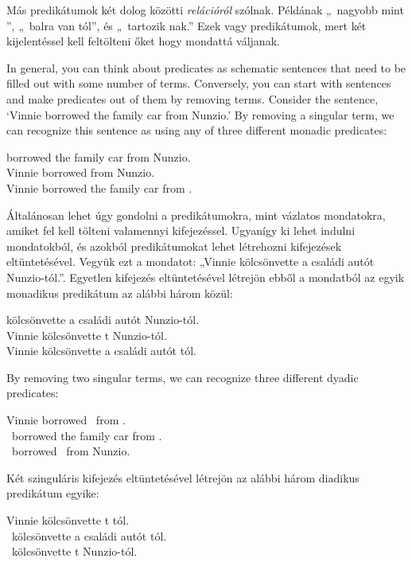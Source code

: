 Más predikátumok két dolog közötti \emph{relációról} szólnak. Példának „\blank\ nagyobb mint \blank”, „\blank\ balra van \blank\-tól”, és „\blank\ tartozik \blank\-nak.” Ezek  vagy  predikátumok, mert két kijelentéssel kell feltölteni őket hogy mondattá váljanak.

In general, you can think about predicates as schematic sentences that need to be filled out with some number of terms. Conversely, you can start with sentences and make predicates out of them by removing terms. Consider the sentence, `Vinnie borrowed the family car from Nunzio.' By removing a singular term, we can recognize this sentence as using any of three different monadic predicates:
\begin{center}
\blank borrowed the family car from Nunzio.\\
Vinnie borrowed \blank from Nunzio.\\
Vinnie borrowed the family car from \blank.
\end{center}

Általánosan lehet úgy gondolni a predikátumokra, mint vázlatos mondatokra, amiket fel kell tölteni valamennyi kifejezéssel. Ugyanígy ki lehet indulni mondatokból, és azokból predikátumokat lehet létrehozni kifejezések eltüntetésével. Vegyük ezt a mondatot: „Vinnie kölcsönvette a családi autót Nunzio-tól.”. Egyetlen kifejezés eltüntetésével létrejön ebből a mondatból az egyik monadikus predikátum az alábbi három közül:
\begin{center}
\blank kölcsönvette a családi autót Nunzio-tól.\\
Vinnie kölcsönvette \blank\-t Nunzio-tól.\\
Vinnie kölcsönvette a családi autót \blank\-tól.
\end{center}

By removing two singular terms, we can recognize three different dyadic predicates:
\begin{center}
Vinnie borrowed \blank\ from \blank.\\
\blank\ borrowed the family car from \blank.\\
\blank\ borrowed \blank\ from Nunzio.
\end{center}

Két szinguláris kifejezés eltüntetésével létrejön az alábbi három diadikus predikátum egyike:
\begin{center}
Vinnie kölcsönvette \blank\-t \blank\-tól.\\
\blank\ kölcsönvette a családi autót \blank\-tól.\\
\blank\ kölcsönvette \blank\-t Nunzio-tól.
\end{center}

